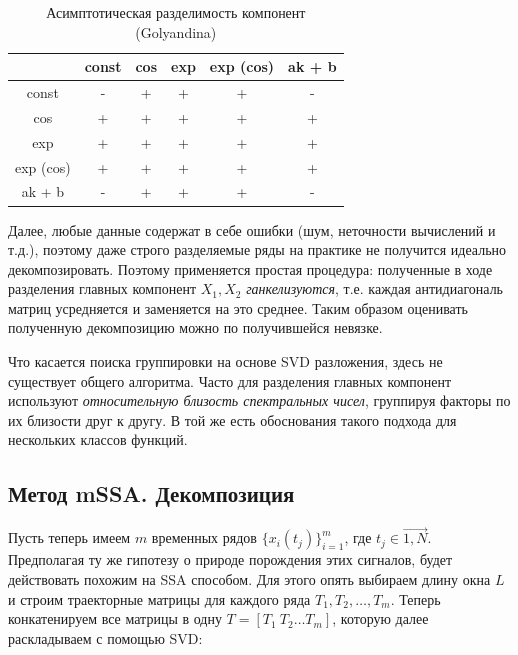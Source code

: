 	    	\begin{table}[h]
	    		\centering
	    		\caption{Асимптотическая разделимость компонент (Golyandina)}\label{tab:asympt_devis}
	    		\begin{tabular}{|c|c|c|c|c|c|}
	    			\hline
	    			& const & cos & exp & exp (cos) & ak + b \\ \hline
	    			const     & -     & +   & +   & +         & -      \\ \hline
	    			cos       & +     & +   & +   & +         & +      \\ \hline
	    			exp       & +     & +   & +   & +         & +      \\ \hline
	    			exp (cos) & +     & +   & +   & +         & +      \\ \hline
	    			ak + b    & -     & +   & +   & +         & -      \\ \hline
	    		\end{tabular}
	    	\end{table}
	    	
	    	Далее, любые данные содержат в себе ошибки (шум, неточности вычислений и т.д.), поэтому даже строго разделяемые ряды на практике не получится идеально декомпозировать. Поэтому применяется простая процедура: полученные в ходе разделения главных компонент $ X_1, X_2 $ \textit{ганкелизуются}, т.е. каждая антидиагональ матриц усредняется и заменяется на это среднее. Таким образом оценивать полученную декомпозицию можно по получившейся невязке. 
	    	
	    	
	    	Что касается поиска группировки на основе SVD разложения, здесь не существует общего алгоритма. Часто для разделения главных компонент используют \textit{относительную близость спектральных чисел}, группируя факторы по их близости друг к другу. В той же \cite{ecfb9dc578be43ae9ee8fc88b8ff9151} есть  обоснования такого подхода для нескольких классов функций.	    	
	    	
	    	
			\subsection*{Метод mSSA. Декомпозиция}
			
			Пусть теперь имеем $ m $ временных рядов $ \{x_i(t_j)\}_{i = 1}^{m} $, где $ t_j \in \overrightarrow{1, N} $. Предполагая ту же гипотезу о природе порождения этих сигналов, будет действовать похожим на SSA способом. Для этого опять выбираем длину окна $ L $ и строим траекторные матрицы для каждого ряда $ T_1, T_2, \ldots , T_m  $. Теперь конкатенируем все матрицы в одну $ T = [T_1 \  T_2 \ldots T_m] $, которую далее раскладываем с помощью SVD:
			
